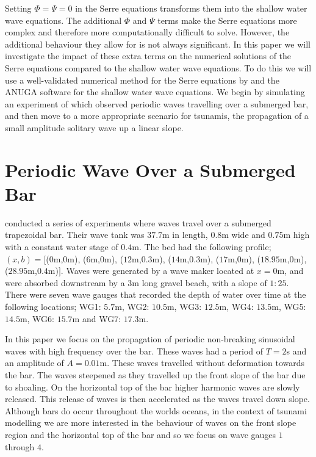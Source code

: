 \documentclass[a4paper,fleqn]{article} %
\begin{document}
Setting $\Phi = \Psi = 0$ in the Serre equations transforms them into the shallow water wave equations. The additional $\Phi$ and $\Psi$ terms make the Serre equations more complex and therefore more computationally difficult to solve. However, the additional behaviour they allow for is not always significant. In this paper we will investigate the impact of these extra terms on the numerical solutions of the Serre equations compared to the shallow water wave equations. To do this we will use a well-validated numerical method for the Serre equations by \cite{Zoppou-etal-2017} and the ANUGA software for the shallow water wave equations. We begin by simulating an experiment of \cite{Beji-Battjes-1994} which observed periodic waves travelling over a submerged bar, and then move to a more appropriate scenario for tsunamis, the propagation of a small amplitude solitary wave up a linear slope. 

\section{Periodic Wave Over a Submerged Bar}
\label{Oscillatory Wave Over a Submerged Bar}
\cite{Beji-Battjes-1994} conducted a series of experiments where waves travel over a submerged trapezoidal bar. Their wave tank was $37.7$m in length, $0.8$m wide and $0.75$m high with a constant water stage of $0.4$m. The bed had the following profile; $(x,b) = [$($0$m,$0$m), ($6$m,$0$m), ($12$m,$0.3$m), ($14$m,$0.3$m), ($17$m,$0$m), ($18.95$m,$0$m), ($28.95$m,$0.4$m)$]$. Waves were generated by a wave maker located at $x=0$m, and were absorbed downstream by a $3$m long gravel beach, with a slope of $1:25$. There were seven wave gauges that recorded the depth of water over time at the following locations; WG1: $5.7$m, WG2: $10.5$m, WG3: $12.5$m, WG4: $13.5$m, WG5: $14.5$m, WG6: $15.7$m and WG7: $17.3$m.

In this paper we focus on the propagation of periodic non-breaking sinusoidal waves with high frequency over the bar. These waves had a period of $T = 2$s and an amplitude of $A = 0.01$m. These waves travelled without deformation towards the bar. The waves steepened as they travelled up the front slope of the bar due to shoaling. On the horizontal top of the bar higher harmonic waves are slowly released. This release of waves is then accelerated as the waves travel down slope. Although bars do occur throughout the worlds oceans, in the context of tsunami modelling we are more interested in the behaviour of waves on the front slope region and the horizontal top of the bar and so we focus on wave gauges $1$ through $4$. 
\end{document}
